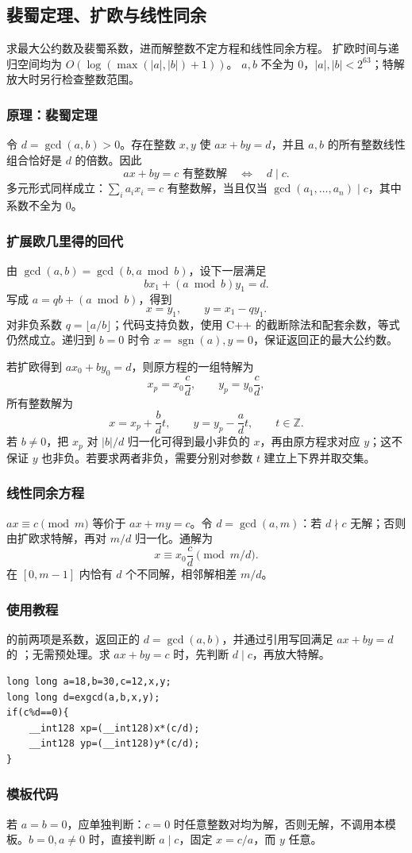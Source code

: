 \subsection{裴蜀定理、扩欧与线性同余}
\label{algo:exgcd}
\AlgorithmInfo
    {求最大公约数及裴蜀系数，进而解整数不定方程和线性同余方程。}
    {扩欧时间与递归空间均为 $O(\log(\max(|a|,|b|)+1))$。}
    {$a,b$ 不全为 $0$，$|a|,|b|<2^{63}$；特解放大时另行检查整数范围。}

\subsubsection*{原理：裴蜀定理}
令 $d=\gcd(a,b)>0$。存在整数 $x,y$ 使 $ax+by=d$，并且 $a,b$ 的所有整数线性组合恰好是 $d$ 的倍数。因此
\[
    ax+by=c\text{ 有整数解}\quad\Longleftrightarrow\quad d\mid c.
\]
多元形式同样成立：$\sum_i a_ix_i=c$ 有整数解，当且仅当 $\gcd(a_1,\ldots,a_n)\mid c$，其中系数不全为 $0$。

\subsubsection*{扩展欧几里得的回代}
由 $\gcd(a,b)=\gcd(b,a\bmod b)$，设下一层满足
\[
    bx_1+(a\bmod b)y_1=d.
\]
写成 $a=q b+(a\bmod b)$，得到
\[
    x=y_1,\qquad y=x_1-qy_1.
\]
对非负系数 $q=\lfloor a/b\rfloor$；代码支持负数，使用 C++ 的截断除法和配套余数，等式仍然成立。递归到 $b=0$ 时令 $x=\operatorname{sgn}(a),y=0$，保证返回正的最大公约数。

若扩欧得到 $ax_0+by_0=d$，则原方程的一组特解为
\[
    x_p=x_0\frac cd,\qquad y_p=y_0\frac cd,
\]
所有整数解为
\[
    x=x_p+\frac bd t,\qquad y=y_p-\frac ad t,\qquad t\in\mathbb Z.
\]
若 $b\ne0$，把 $x_p$ 对 $|b|/d$ 归一化可得到最小非负的 $x$，再由原方程求对应 $y$；这不保证 $y$ 也非负。若要求两者非负，需要分别对参数 $t$ 建立上下界并取交集。

\subsubsection*{线性同余方程}
$ax\equiv c\pmod m$ 等价于 $ax+my=c$。令 $d=\gcd(a,m)$：若 $d\nmid c$ 无解；否则由扩欧求特解，再对 $m/d$ 归一化。通解为
\[
    x\equiv x_0\frac cd\pmod{m/d}.
\]
在 $[0,m-1]$ 内恰有 $d$ 个不同解，相邻解相差 $m/d$。

\subsubsection*{使用教程}
 的前两项是系数，返回正的 $d=\gcd(a,b)$，并通过引用写回满足 $ax+by=d$ 的 ；无需预处理。求 $ax+by=c$ 时，先判断 $d\mid c$，再放大特解。
\begin{lstlisting}[style=mtycpp,numbers=none]
long long a=18,b=30,c=12,x,y;
long long d=exgcd(a,b,x,y);
if(c%d==0){
	__int128 xp=(__int128)x*(c/d);
	__int128 yp=(__int128)y*(c/d);
}
\end{lstlisting}

\subsubsection*{模板代码}

若 $a=b=0$，应单独判断：$c=0$ 时任意整数对均为解，否则无解，不调用本模板。$b=0,a\ne0$ 时，直接判断 $a\mid c$，固定 $x=c/a$，而 $y$ 任意。
